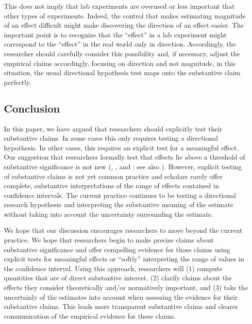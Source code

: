 \documentclass[12pt]{article}
\begin{document}
This does not imply that lab experiments are overused or less important that other types of experiments. Indeed, the control that makes estimating magnitude of an effect difficult might make discovering the direction of an effect easier. The important point is to recognize that the ``effect'' in a lab experiment might correspond to the ``effect'' in the real world only in direction. Accordingly, the researcher should carefully consider this possibility and, if necessary, adjust the empirical claims accordingly, focusing on direction and not magnitude, in this situation, the usual directional hypothesis test maps onto the substantive claim perfectly.


\subsection*{Conclusion}

In this paper, we have argued that researchers should explicitly test their substantive claims. In some cases this only requires testing a directional hypothesis. In other cases, this requires an explicit test for a meaningful effect. Our suggestion that researchers formally test that effects lie above a threshold of substantive significance is not new (\citealt{Achen1982}, \citealt{Rainey2014}, and \citealt{Gross2014}; see also \citealt{EsareyDanneman2014}). However, explicit testing of substantive claims is not yet common practice and scholars rarely offer complete, substantive interpretations of the range of effects contained in confidence intervals. The current practice continues to be testing a directional research hypothesis and interpreting the substantive meaning of the estimate without taking into account the uncertainty surrounding the estimate. 

We hope that our discussion encourages researchers to move beyond the current practice. We hope that researchers begin to make precise claims about substantive significance and offer compelling evidence for those claims using explicit tests for meaningful effects or ``softly'' interpreting the range of values in the confidence interval. Using this approach, researchers will (1) compute quantities that are of direct substantive interest, (2) clarify claims about the effects they consider theoretically and/or normatively important, and (3) take the uncertainly of the estimates into account when assessing the evidence for their substantive claims. This leads more transparent substantive claims and clearer communication of the empirical evidence for these claims.

\singlespace 
\normalsize
\singlespace

% 

\end{document}
